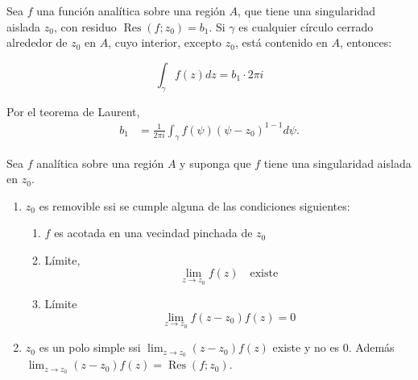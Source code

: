 \begin{teorema}
    Sea $f$ una función analítica sobre una región $A$, que tiene una singularidad aislada $z_0$, con residuo $\operatorname{Res}(f;z_0)=b_1$. Si $\gamma$ es cualquier círculo cerrado alrededor de $z_0$ en $A$, cuyo interior, excepto $z_0$, está contenido en $A$, entonces: 

    $$\int_\gamma f(z)dz=b_1\cdot 2\pi i$$
    \begin{dem}
        Por el teorema de Laurent,
        \begin{align*}
            b_1 &= \frac{1}{2\pi i}\int_\gamma f(\psi)(\psi -z_0)^{1-1}d\psi.
        \end{align*}
    \end{dem}
\end{teorema}

\begin{teorema}
    Sea $f$ analítica sobre una región $A$ y suponga que $f$ tiene una singularidad aislada en $z_0$. 
    \begin{enumerate}
        \item $z_0$ es removible ssi se cumple alguna de las condiciones siguientes:
        \begin{enumerate}
            \item $f$ es acotada en una vecindad pinchada de $z_0$ 
            \item Límite, 
            $$\lim_{z\to z_0}f(z)\quad \text{existe}$$
            \item Límite 
            $$\lim_{z\to z_0}f(z-z_0)f(z) = 0$$
        \end{enumerate}
        \item $z_0$ es un polo simple ssi $\lim_{z\to z_0}(z-z_0)f(z)$ existe y no es $0$. Además $\lim_{z\to z_0}(z-z_0)f(z)=\operatorname{Res}(f;z_0)$.
    \end{enumerate}
\end{teorema}